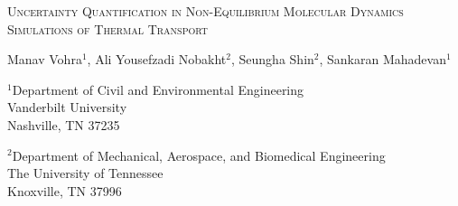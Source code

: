 \begin{center}
\textsc{
Uncertainty Quantification in Non-Equilibrium Molecular Dynamics Simulations of
Thermal Transport
}

\bigskip 
\bigskip 

Manav Vohra$^{1}$, Ali Yousefzadi Nobakht$^{2}$, Seungha Shin$^{2}$, Sankaran Mahadevan$^{1}$

\bigskip
\bigskip

\normalsize
$^1$Department of Civil and Environmental Engineering\\
Vanderbilt University\\
Nashville, TN 37235\\

\bigskip

$^2$Department of Mechanical, Aerospace, and Biomedical Engineering\\
The University of Tennessee\\
Knoxville, TN 37996\\

\bigskip

\end{center}

%
%
%

